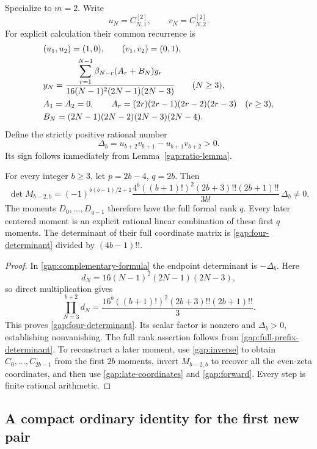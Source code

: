 Specialize to $m=2$. Write
\[
 u_N=C_{N,1}^{[2]},\qquad v_N=C_{N,2}^{[2]}.
\]
For explicit calculation their common recurrence is
\begin{align}
 &(u_1,u_2)=(1,0),\qquad(v_1,v_2)=(0,1),\notag\\
 &y_N=\frac{\displaystyle\sum_{r=1}^{N-1}
                   \beta_{N-r}(A_r+B_N)y_r}
                {16(N-1)^2(2N-1)(2N-3)}\qquad(N\ge3),
 \label{gap:four-recurrence}\\
 &A_1=A_2=0,\qquad
 A_r=(2r)(2r-1)(2r-2)(2r-3)\quad(r\ge3),\notag\\
 &B_N=(2N-1)(2N-2)(2N-3)(2N-4).\notag
\end{align}
Define the strictly positive rational number
\begin{equation}\label{gap:delta}
 \Delta_b=u_{b+2}v_{b+1}-u_{b+1}v_{b+2}>0.
\end{equation}
Its sign follows immediately from Lemma~\ref{gap:ratio-lemma}.

\begin{theorem}[Every pair $q=p+4$]\label{gap:main}
For every integer $b\ge3$, let $p=2b-4$, $q=2b$. Then
\begin{equation}\label{gap:four-determinant}
 \det M_{b-2,b}
 =(-1)^{b(b-1)/2+1}
 \frac{4^b((b+1)!)^2(2b+3)!!(2b+1)!!}{3b!}\,\Delta_b\ne0.
\end{equation}
The moments $D_0,\ldots,D_{q-1}$ therefore have the full formal
rank $q$. Every later centered moment is an explicit rational
linear combination of these first $q$ moments. The determinant
of their full coordinate matrix is
\eqref{gap:four-determinant} divided by $(4b-1)!!$.
\end{theorem}

\begin{proof}
In \eqref{gap:complementary-formula} the endpoint determinant is
$-\Delta_b$. Here
\[
 d_N=16(N-1)^2(2N-1)(2N-3),
\]
so direct multiplication gives
\[
 \prod_{N=3}^{b+2}d_N
 =\frac{16^b((b+1)!)^2(2b+3)!!(2b+1)!!}{3}.
\]
This proves \eqref{gap:four-determinant}. Its scalar factor is
nonzero and $\Delta_b>0$, establishing nonvanishing. The full
rank assertion follows from \eqref{gap:full-prefix-determinant}.
To reconstruct a later moment, use \eqref{gap:inverse} to obtain
$C_0,\ldots,C_{2b-1}$ from the first $2b$ moments, invert
$M_{b-2,b}$ to recover all the even-zeta coordinates, and then use
\eqref{gap:late-coordinates} and \eqref{gap:forward}. Every step is
finite rational arithmetic.
\end{proof}

\subsection{A compact ordinary identity for the first new pair}

